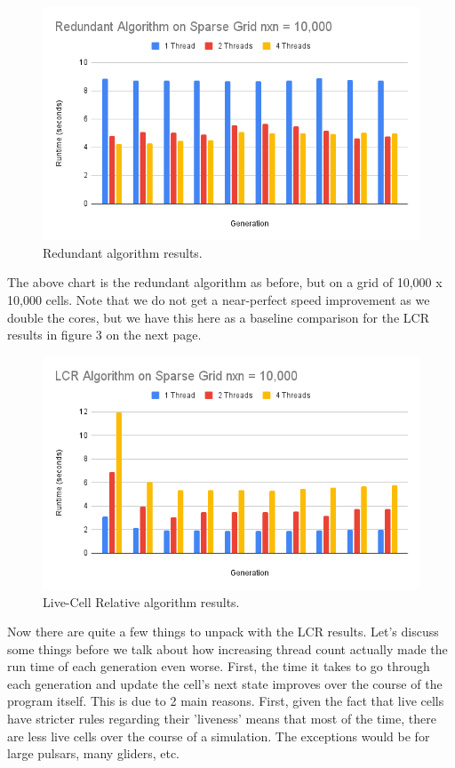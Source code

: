 \documentclass[12pt]{article}
\begin{document}
\begin{figure}[!ht]
\centering
\includegraphics[width=\linewidth]{redundant_10000.PNG}
\caption{\label{fig:chart_2}Redundant algorithm results.}
\end{figure}

The above chart is the redundant algorithm as before, but on a grid of 10,000 x 10,000 cells. Note that we do not get a near-perfect speed improvement as we double the cores, but we have this here as a baseline comparison for the LCR results in figure 3 on the next page.

\begin{figure}[!ht]
\centering
\includegraphics[width=\linewidth]{lcr_10000.PNG}
\caption{\label{fig:chart_3}Live-Cell Relative algorithm results.}
\end{figure}

Now there are quite a few things to unpack with the LCR results. Let's discuss some things before we talk about how increasing thread count actually made the run time of each generation even worse. First, the time it takes to go through each generation and update the cell's next state improves over the course of the program itself. This is due to 2 main reasons. First, given the fact that live cells have stricter rules regarding their 'liveness' means that most of the time, there are less live cells over the course of a simulation. The exceptions would be for large pulsars, many gliders, etc.
\end{document}
